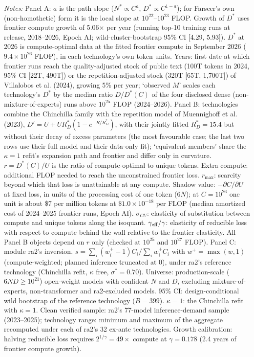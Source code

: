 \begin{table}[htbp]
\begin{tablenotes}
\item \textit{Notes:} Panel A: $a$ is the path slope ($N^*\propto C^{a}$, $D^*\propto C^{1-a}$); for Farseer's own (non-homothetic) form it is the local slope at $10^{22}$--$10^{23}$ FLOP. Growth of $D^*$ uses frontier compute growth of 5.06$\times$ per year (running top-10 training runs at release, 2018--2026, Epoch AI; wild-cluster-bootstrap 95\% CI [4.29, 5.93]). $D^*$ at 2026 is compute-optimal data at the fitted frontier compute in September 2026 ($9.4\times10^{26}$ FLOP), in each technology's own token units. Years: first date at which frontier runs reach the quality-adjusted stock of public text (100T tokens in 2024, 95\% CI [22T, 490T]) or the repetition-adjusted stock (320T [65T, 1,700T]) of Villalobos et al. (2024), growing 5\% per year; `observed $M$' scales each technology's $D^*$ by the median ratio $D/D^*(C)$ of the four disclosed dense (non-mixture-of-experts) runs above $10^{25}$ FLOP (2024--2026). Panel B: technologies combine the Chinchilla family with the repetition model of Muennighoff et al. (2023), $D'=U+UR^*_D(1-e^{-R/R^*_D})$, with their jointly fitted $R^*_D=15.4$ but without their decay of excess parameters (the most favourable case; the last two rows use their full model and their data-only fit); `equivalent members' share the $\kappa=1$ refit's expansion path and frontier and differ only in curvature. $r=D^*(C)/U$ is the ratio of compute-optimal to unique tokens. Extra compute: additional FLOP needed to reach the unconstrained frontier loss. $r_{\max}$: scarcity beyond which that loss is unattainable at any compute. Shadow value: $-\partial C/\partial U$ at fixed loss, in units of the processing cost of one token ($6N$); at $C=10^{26}$ one unit is about \$7 per million tokens at \$$1.0\times10^{-18}$ per FLOP (median amortized cost of 2024--2025 frontier runs, Epoch AI). $\sigma_{CU}$: elasticity of substitution between compute and unique tokens along the isoquant. $\gamma_{\rm eff}/\gamma$: elasticity of reducible loss with respect to compute behind the wall relative to the frontier elasticity. All Panel B objects depend on $r$ only (checked at $10^{25}$ and $10^{27}$ FLOP). Panel C: module ra2's inversion. $s=\sum_i(w_i^+-1)C_i/\sum_i w_i^+C_i$ with $w^+=\max(w,1)$ (compute-weighted; planned inference truncated at 0), under ra2's reference technology (Chinchilla refit, $\kappa$ free, $\sigma^*=0.70$). Universe: production-scale ($6ND\geq10^{21}$) open-weight models with confident $N$ and $D$, excluding mixture-of-experts, non-transformer and ra2-excluded models. 95\% CI: design-conditional wild bootstrap of the reference technology ($B=399$). $\kappa=1$: the Chinchilla refit with $\kappa=1$. Clean verified sample: ra2's 77-model inference-demand sample (2023--2025); technology range: minimum and maximum of the aggregate recomputed under each of ra2's 32 ex-ante technologies. Growth calibration: halving reducible loss requires $2^{1/\gamma}=49\times$ compute at $\gamma=0.178$ (2.4 years of frontier compute growth).
\end{tablenotes}
\end{table}
